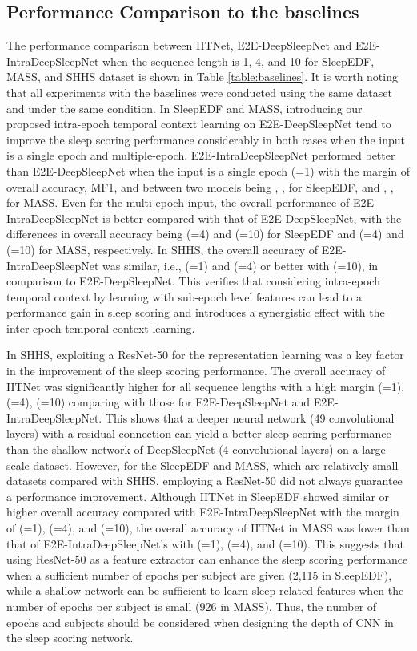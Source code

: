 \documentclass[10pt,twocolumn,twoside]{IEEEtran}
\begin{document}
    
    
    \subsection{Performance Comparison to the baselines}
        The performance comparison between IITNet, E2E-DeepSleepNet and E2E-IntraDeepSleepNet when the sequence length  is 1, 4, and 10 for SleepEDF, MASS, and SHHS dataset is shown in Table \ref{table:baselines}. It is worth noting that all experiments with the baselines were conducted using the same dataset and under the same condition. In SleepEDF and MASS, introducing our proposed intra-epoch temporal context learning on E2E-DeepSleepNet tend to improve the sleep scoring performance considerably in both cases when the input is a single epoch and multiple-epoch. E2E-IntraDeepSleepNet performed better than E2E-DeepSleepNet when the input is a single epoch (=1) with the margin of overall accuracy, MF1, and  between two models being , ,  for SleepEDF, and , ,  for MASS. Even for the multi-epoch input, the overall performance of E2E-IntraDeepSleepNet is better compared with that of E2E-DeepSleepNet, with the differences in overall accuracy being  (=4) and  (=10) for SleepEDF and  (=4) and   (=10) for MASS, respectively. In SHHS, the overall accuracy of E2E-IntraDeepSleepNet was similar, i.e.,  (=1) and  (=4) or better with  (=10), in comparison to E2E-DeepSleepNet. This verifies that considering intra-epoch temporal context by learning with sub-epoch level features can lead to a performance gain in sleep scoring and introduces a synergistic effect with the inter-epoch temporal context learning.
    
    In SHHS, exploiting a ResNet-50 for the representation learning was a key factor in the improvement of the sleep scoring performance. The overall accuracy of IITNet was significantly higher for all sequence lengths with a high margin  (=1),  (=4),  (=10) comparing with those for E2E-DeepSleepNet and E2E-IntraDeepSleepNet. This shows that a deeper neural network (49 convolutional layers) with a residual connection can yield a better sleep scoring performance than the shallow network of DeepSleepNet (4 convolutional layers) on a large scale dataset. However, for the SleepEDF and MASS, which are relatively small datasets compared with SHHS, employing a ResNet-50 did not always guarantee a performance improvement. Although IITNet in SleepEDF showed similar or higher overall accuracy compared with E2E-IntraDeepSleepNet with the margin of  (=1),  (=4), and  (=10), the overall accuracy of IITNet in MASS was lower than that of E2E-IntraDeepSleepNet’s with  (=1),  (=4), and  (=10). This suggests that using ResNet-50 as a feature extractor can enhance the sleep scoring performance when a sufficient number of epochs per subject are given (2,115 in SleepEDF), while a shallow network can be sufficient to learn sleep-related features when the number of epochs per subject is small (926 in MASS). Thus, the number of epochs and subjects should be considered when designing the depth of CNN in the sleep scoring network.
    
\end{document}
